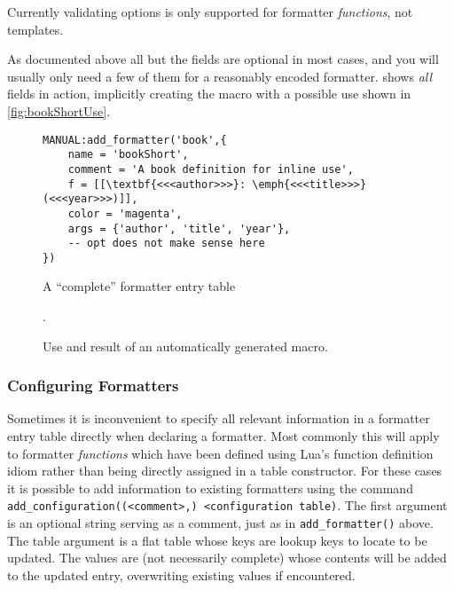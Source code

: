 \documentclass[12pt]{scrartcl}
\begin{document}
 Currently validating options is only supported for formatter
\emph{functions}, not templates.

\bigskip

As documented above all but the  fields are optional in most cases,
and you will usually only need a few of them for a reasonably encoded formatter.
 shows \emph{all} fields in action, implicitly creating the
macro  with a possible use shown in
\vref{fig:bookShortUse}.

\begin{figure}
\begin{verbatim}
MANUAL:add_formatter('book',{
    name = 'bookShort',
    comment = 'A book definition for inline use',
    f = [[\textbf{<<<author>>>}: \emph{<<<title>>>} (<<<year>>>)]],
    color = 'magenta',
    args = {'author', 'title', 'year'},
    -- opt does not make sense here
})
\end{verbatim}
\caption{A “complete” formatter entry table}
\label{fig:bookShort}
\end{figure}

\begin{figure}
.
\caption{Use and result of an automatically generated macro.}
\label{fig:bookShortUse}
\end{figure}


\subsubsection{Configuring Formatters}
\label{sec:usage:configuring-formatters}

Sometimes it is inconvenient to specify all relevant information in a formatter
entry table directly when declaring a formatter.  Most commonly this will
apply to formatter \emph{functions} which have been defined using Lua's function
definition idiom rather than being directly assigned in a table constructor.
For these cases it is possible to add information to existing formatters using
the command \texttt{add_configuration((<comment>,) <configuration
table)}. The first argument is an optional string serving as a comment, just as in \texttt{add_formatter()} above.  The table argument is a flat table whose keys are lookup keys to locate  to be updated. The values are (not necessarily complete)  whose contents will be added to the updated entry, overwriting existing values if encountered.
\end{document}

